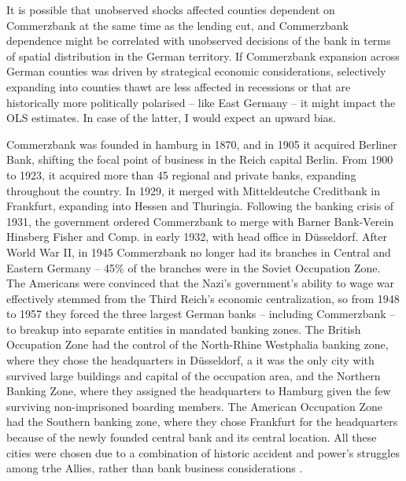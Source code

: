 \documentclass[11pt]{article}
\begin{document}
It is possible that unobserved shocks affected counties dependent on Commerzbank at the same time as the lending cut, and Commerzbank dependence might be correlated with unobserved decisions of the bank in terms of spatial distribution in the German territory. If Commerzbank expansion across German counties was driven by strategical economic considerations, selectively expanding into counties thawt are less affected in recessions or that are historically more politically polarised -- like East Germany -- it might impact the OLS estimates. In case of the latter, I would expect an upward bias.

Commerzbank was founded in hamburg in 1870, and in 1905 it acquired Berliner Bank, shifting the focal point of business in the Reich capital Berlin. From 1900 to 1923, it acquired more than 45 regional and private banks, expanding throughout the country. In 1929, it merged with Mitteldeutche Creditbank in Frankfurt, expanding into Hessen and Thuringia. Following the banking crisis of 1931, the government ordered Commerzbank to merge with Barner Bank-Verein Hinsberg Fisher and Comp. in early 1932, with head office in D\"{u}sseldorf. After World War II, in 1945 Commerzbank no longer had its branches in Central and Eastern Germany -- 45\% of the branches were in the Soviet Occupation Zone. The Americans were convinced that the Nazi's government's ability to wage war effectively stemmed from the Third Reich's economic centralization, so from 1948 to 1957 they forced the three largest German banks -- including Commerzbank -- to breakup into separate entities in mandated banking zones. The British Occupation Zone had the control of the North-Rhine Westphalia banking zone, where they chose the headquarters in D\"{u}sseldorf, a it was the only city with survived large buildings and capital of the occupation area, and the Northern Banking Zone, where they assigned the headquarters to Hamburg given the few surviving non-imprisoned boarding members. The American Occupation Zone had the Southern banking zone, where they chose Frankfurt for the headquarters because of the newly founded central bank and its central location. All these cities were chosen due to a combination of historic accident and power's struggles among trhe Allies, rather than bank business considerations \citep{bib:huber2018}.
\end{document}
